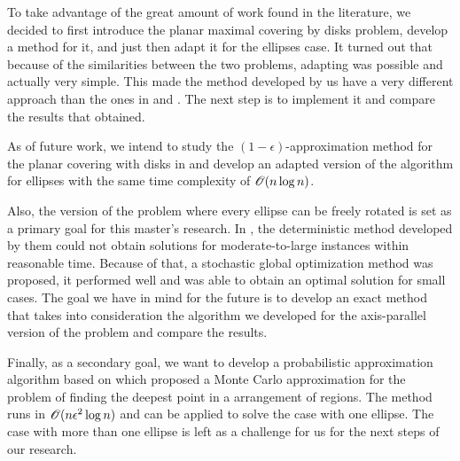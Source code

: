 To take advantage of the great amount of work found in the literature,
 we decided to first introduce the planar maximal covering by disks problem, develop a method for it, and just then adapt it for the ellipses case. It turned out that because of the similarities between the two problems, adapting was possible and actually very simple. This made the method developed by us have a very different approach than the ones in \cite{andreta} and \cite{canbolat}. The next step is to implement it and compare the results that \cite{andreta} obtained.
 
As of future work, we intend to study the $(1-\epsilon)$-approximation method for the planar covering with disks in \cite{cabello:2006} and develop an adapted version of the algorithm for ellipses with the same time complexity of $\mathscr{O}(n\log{n})$.

Also, the version of the problem where every ellipse can be freely rotated is set as a primary goal for this master's research. In \cite{andreta}, the deterministic method developed by them could not obtain solutions for moderate-to-large instances within reasonable time. Because of that, a stochastic global optimization method was proposed, it performed well and was able to obtain an optimal solution for small cases. The goal we have in mind for the future is to develop an exact method that takes into consideration the algorithm we developed for the axis-parallel version of the problem and compare the results.

Finally, as a secondary goal, we want to develop a probabilistic approximation algorithm based on \cite{aronov:2008} which proposed a Monte Carlo approximation for the problem of finding the deepest point in a arrangement of regions. The method runs in $\mathscr{O}(n\epsilon^2\log{n})$ and can be applied to solve the case with one ellipse. The case with more than one ellipse is left as a challenge for us for the next steps of our research.

